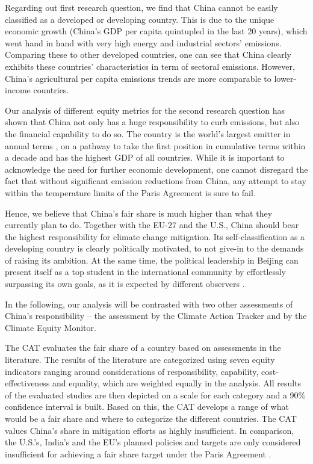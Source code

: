 \documentclass[
  12pt,
]{article}
\numberwithin{equation}{section}
\numberwithin{table}{section}
\numberwithin{figure}{section}
\begin{document}
Regarding out first research question, we find that China cannot be
easily classified as a developed or developing country. This is due to
the unique economic growth (China's GDP per capita quintupled in the
last 20 years), which went hand in hand with very high energy and
industrial sectors' emissions. Comparing these to other developed
countries, one can see that China clearly exhibits these countries'
characteristics in term of sectoral emissions. However, China's
agricultural per capita emissions trends are more comparable to
lower-income countries.

Our analysis of different equity metrics for the second research
question has shown that China not only has a huge responsibility to curb
emissions, but also the financial capability to do so. The country is
the world's largest emitter in annual terms , on a pathway to take the
first position in cumulative terms within a decade and has the highest
GDP of all countries. While it is important to acknowledge the need for
further economic development, one cannot disregard the fact that without
significant emission reductions from China, any attempt to stay within
the temperature limits of the Paris Agreement is sure to fail.

Hence, we believe that China's fair share is much higher than what they
currently plan to do. Together with the EU-27 and the U.S., China should
bear the highest responsibility for climate change mitigation. Its
self-classification as a developing country is clearly politically
motivated, to not give-in to the demands of raising its ambition. At the
same time, the political leadership in Beijing can present itself as a
top student in the international community by effortlessly surpassing
its own goals, as it is expected by different observers \citep{CAT2022}.

In the following, our analysis will be contrasted with two other
assessments of China's responsibility -- the assessment by the Climate
Action Tracker and by the Climate Equity Monitor.

The CAT evaluates the fair share of a country based on assessments in
the literature. The results of the literature are categorized using
seven equity indicators ranging around considerations of responsibility,
capability, cost-effectiveness and equality, which are weighted equally
in the analysis. All results of the evaluated studies are then depicted
on a scale for each category and a 90\% confidence interval is built.
Based on this, the CAT develops a range of what would be a fair share
and where to categorize the different countries. The CAT values China's
share in mitigation efforts as highly insufficient. In comparison, the
U.S.'s, India's and the EU's planned policies and targets are only
considered insufficient for achieving a fair share target under the
Paris Agreement \citep{CAT2022}.
\end{document}
